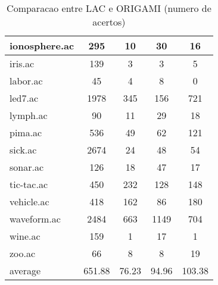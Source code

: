 \begin{table}[htbp]
\begin{tabular}{|l|c|c|c|c|}
		\hline
		ionosphere.ac   & 295           & 10                 & 30                       & 16                            \\
		\hline
		iris.ac         & 139           & 3                  & 3                        & 5                             \\
		\hline
		labor.ac        & 45            & 4                  & 8                        & 0                             \\
		\hline
		led7.ac         & 1978          & 345                & 156                      & 721                           \\
		\hline
		lymph.ac        & 90            & 11                 & 29                       & 18                            \\
		\hline
		pima.ac         & 536           & 49                 & 62                       & 121                           \\
		\hline
		sick.ac         & 2674          & 24                 & 48                       & 54                            \\
		\hline
		sonar.ac        & 126           & 18                 & 47                       & 17                            \\
		\hline
		tic-tac.ac      & 450           & 232                & 128                      & 148                           \\
		\hline
		vehicle.ac      & 418           & 162                & 86                       & 180                           \\
		\hline
		waveform.ac     & 2484          & 663                & 1149                     & 704                           \\
		\hline
		wine.ac         & 159           & 1                  & 17                       & 1                             \\
		\hline
		zoo.ac          & 66            & 8                  & 8                        & 19                            \\
		\hline
		average         & 651.88        & 76.23              & 94.96                    & 103.38                        \\
		\hline
		\end{tabular}
	\caption{Comparacao entre LAC e ORIGAMI (numero de acertos)}
	\label{tab:comparison_lac_origami}
\end{table}